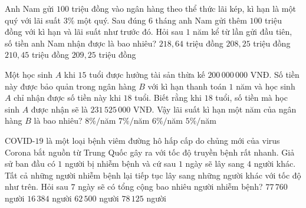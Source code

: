 \begin{ex}%
	Anh Nam gửi $100$ triệu đồng vào ngân hàng theo thể thức lãi kép, kì hạn là một quý với lãi suất $3\%$ một quý. Sau đúng  $6$ tháng anh Nam gửi thêm $100$ triệu đồng với kì hạn và lãi suất như trước đó. Hỏi sau $1$ năm kể từ lần gửi đầu tiên, số tiền anh Nam nhận được là bao nhiêu?
	\choice 
		 {\True $218{,}64$ triệu đồng}
		{$208{,}25$  triệu đồng}
		{$210{,}45$ triệu  đồng}
		 {$209{,}25$ triệu đồng}
\end{ex}

\begin{ex}%
	Một học sinh $A$ khi $15$ tuổi được hưởng tài sản thừa kế $200\,000\,000$ VNĐ. Số tiền này được bảo quản trong ngân hàng $B$ với kì hạn thanh toán $1$ năm và học sinh $A$ chỉ nhận được số tiền này khi $18$ tuổi. Biết rằng khi $18$ tuổi, số tiền mà học sinh $A$ được nhận sẽ là $231\,525\,000$ VNĐ. Vậy lãi suất kì hạn một năm của ngân hàng $B$  là bao nhiêu?
	 \choice
		 {$8\%/$năm}
		 {$7\%/$năm}
		 {$6\%/$năm}
		{\True $5\%/$năm} 
\end{ex}

\begin{ex}%
	COVID-$19$ là một loại bệnh viêm đường hô hấp cấp do chủng mới của virus Corona bắt nguồn từ Trung Quốc gây ra với tốc độ truyền bệnh rất nhanh. Giả sử ban đầu có $1$ người bị nhiễm bệnh và cứ sau $1$ ngày sẽ lây sang $4$ người khác. Tất cả những người nhiễm bệnh lại tiếp tục lây sang những  người khác với tốc độ như trên. Hỏi sau $7$ ngày sẽ có tổng cộng bao nhiêu người nhiễm bệnh?
	\choice 
		{$77\,760$ người} 
		{$16\,384$ người} 
		{$62\,500$  người}
		{\True $78\,125$  người}
\end{ex}

